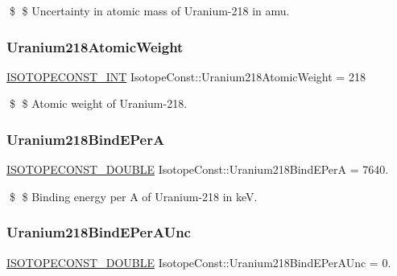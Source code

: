 \$ \$ Uncertainty in atomic mass of Uranium-\/218 in amu. \mbox{\label{group___isotope_const-_uranium-_u218_ga51e29b9a444b271e1c14b1cfb5226c82}} 
\subsubsection{\texorpdfstring{Uranium218\+Atomic\+Weight}{Uranium218AtomicWeight}}
{\footnotesize\ttfamily \mbox{\hyperlink{group___isotope_const-_macros_ga5f18360b3e99483a35c32d789e62621c}{I\+S\+O\+T\+O\+P\+E\+C\+O\+N\+S\+T\+\_\+\+I\+NT}} Isotope\+Const\+::\+Uranium218\+Atomic\+Weight = 218}

\$ \$ Atomic weight of Uranium-\/218. \mbox{\label{group___isotope_const-_uranium-_u218_ga05265651482e288475118415ef027db7}} 
\subsubsection{\texorpdfstring{Uranium218\+Bind\+E\+PerA}{Uranium218BindEPerA}}
{\footnotesize\ttfamily \mbox{\hyperlink{group___isotope_const-_macros_ga8f45a7272ce02c0b4c65c44636ed719a}{I\+S\+O\+T\+O\+P\+E\+C\+O\+N\+S\+T\+\_\+\+D\+O\+U\+B\+LE}} Isotope\+Const\+::\+Uranium218\+Bind\+E\+PerA = 7640.}

\$ \$ Binding energy per A of Uranium-\/218 in keV. \mbox{\label{group___isotope_const-_uranium-_u218_ga9187a66508facd6ed31e09a7154e7c98}} 
\subsubsection{\texorpdfstring{Uranium218\+Bind\+E\+Per\+A\+Unc}{Uranium218BindEPerAUnc}}
{\footnotesize\ttfamily \mbox{\hyperlink{group___isotope_const-_macros_ga8f45a7272ce02c0b4c65c44636ed719a}{I\+S\+O\+T\+O\+P\+E\+C\+O\+N\+S\+T\+\_\+\+D\+O\+U\+B\+LE}} Isotope\+Const\+::\+Uranium218\+Bind\+E\+Per\+A\+Unc = 0.}

